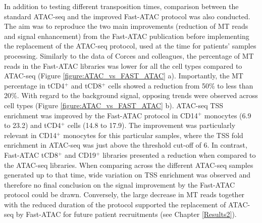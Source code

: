 In addition to testing different transposition times, comparison between the standard ATAC-seq and the improved Fast-ATAC protocol \parencite{Corces2016} was also conducted. The aim was to reproduce the two main improvements (reduction of MT reads and signal enhancement) from the Fast-ATAC publication before implementing the replacement of the ATAC-seq protocol, used at the time for patients' samples processing. Similarly to the data of Corces and colleagues, the percentage of MT reads in the Fast-ATAC libraries was lower for all the cell types compared to ATAC-seq (Figure \ref{figure:ATAC_vs_FAST_ATAC} a). Importantly, the MT percentage in tCD4$^+$ and tCD8$^+$ cells showed a reduction from 50\% to less than 20\%. With regard to the background signal, opposing trends were observed across cell types (Figure \ref{figure:ATAC_vs_FAST_ATAC} b). ATAC-seq TSS enrichment was improved by the Fast-ATAC protocol in CD14$^+$ monocytes (6.9 to 23.2) and tCD4$^+$ cells (14.8 to 17.9). The improvement was particularly relevant in CD14$^+$ monocytes for this particular samples, where the TSS fold enrichment in ATAC-seq was just above the threshold cut-off of 6. In contrast, Fast-ATAC tCD8$^+$ and CD19$^+$ libraries presented a reduction when compared to the ATAC-seq libraries. When comparing across the different ATAC-seq samples generated up to that time, wide variation on TSS enrichment was observed and therefore no final conclusion on the signal improvement by the Fast-ATAC protocol could be drawn. Conversely, the large decrease in MT reads together with the reduced duration of the protocol supported the replacement of ATAC-seq by Fast-ATAC for future patient recruitments (see Chapter \ref{Results2}). 



